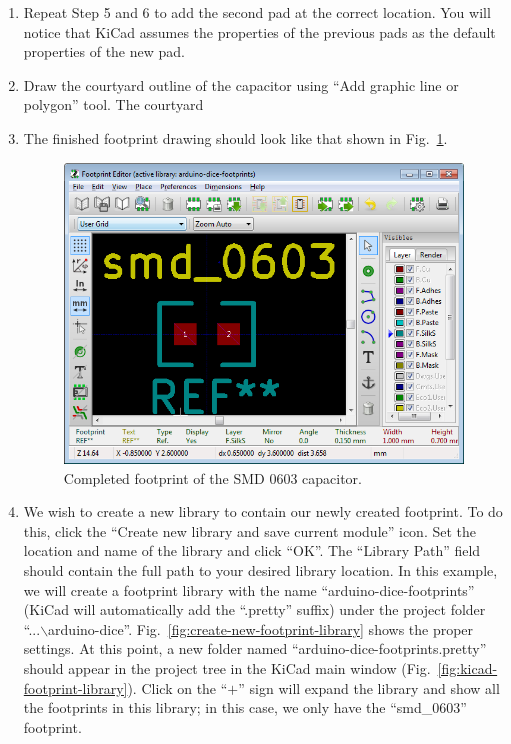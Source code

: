 \documentclass[12pt,letterpaper]{scrartcl}
\begin{document}
\begin{enumerate}
	\item Repeat Step 5 and 6 to add the second pad at the correct location. You will notice that KiCad assumes the properties of the previous pads as the default properties of the new pad. 
	
	\item Draw the courtyard outline of the capacitor using ``Add graphic line or polygon'' tool. The courtyard 
	\item The finished footprint drawing should look like that shown in Fig.~\ref{fig:smd_cap_footprint_final}.
		
		\begin{figure}[h]
			\centering
			\includegraphics[width=4.5in]{smd_cap_footprint_final}
			\caption{Completed footprint of the SMD 0603 capacitor.}
			\label{fig:smd_cap_footprint_final}
		\end{figure}
			
	\item We wish to create a new library to contain our newly created footprint. To do this, click the ``Create new library and save current module'' icon. Set the location and name of the library and click ``OK''. The ``Library Path'' field should contain the full path to your desired library location. In this example, we will create a footprint library with the name ``arduino-dice-footprints'' (KiCad will automatically add the ``.pretty'' suffix) under the project folder ``...$\backslash$arduino-dice''. Fig.~\ref{fig:create-new-footprint-library} shows the proper settings. At this point, a new folder named ``arduino-dice-footprints.pretty'' should appear in the project tree in the KiCad main window (Fig.~\ref{fig:kicad-footprint-library}). Click on the ``$+$'' sign will expand the library and show all the footprints in this library; in this case, we only have the ``smd\_0603'' footprint.
	

\end{enumerate}
\end{document}

